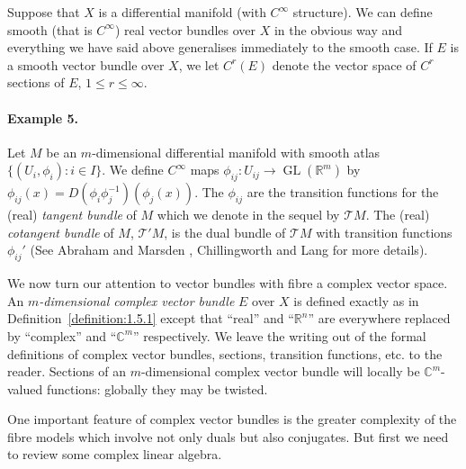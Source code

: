 Suppose that $X$ is a differential manifold (with $C^\infty$ structure). We can define smooth (that is $C^\infty$) real vector bundles over $X$ in the obvious way and everything we have said above generalises immediately to the smooth case. If $E$ is a smooth vector bundle over $X$, we let $C^r(E)$ denote the vector space of $C^r$ sections of $E$, $1\leq r\leq\infty$.

\paragraph*{Example 5.} Let $M$ be an $m$-dimensional differential manifold with smooth atlas $\{(U_i,\phi_i):i\in I\}$. We define $C^\infty$ maps $\phi_{ij}:U_{ij}\to\operatorname{GL}(\mathbb R^m)$ by $\phi_{ij}(x)=D(\phi_i\phi_j^{-1})(\phi_j(x))$. The $\phi_{ij}$ are the transition functions for the (real) \emph{tangent bundle} of $M$ which we denote in the sequel by $\mathcal T M$. The (real) \emph{cotangent bundle} of $M$, $\mathcal T'M$, is the dual bundle of $\mathcal T M$ with transition functions $\phi_{ij}'$ (See Abraham and Marsden \cite{bib:I:abraham-r-and-marsden-j-e:1}, Chillingworth \cite{bib:I:chillingworth-d-r-j:1} and Lang \cite{bib:I:lang-s:1} for more details).

We now turn our attention to vector bundles with fibre a complex vector space. An \emph{$m$-dimensional complex vector bundle} $E$ over $X$ is defined exactly as in Definition~\ref{definition:1.5.1} except that ``real'' and ``$\mathbb R^n$'' are everywhere replaced by ``complex'' and ``$\mathbb C^m$'' respectively. We leave the writing out of the formal definitions of complex vector bundles, sections, transition functions, etc. to the reader. Sections of an $m$-dimensional complex vector bundle will locally be $\mathbb C^m$-valued functions: globally they may be twisted.

One important feature of complex vector bundles is the greater complexity of the fibre models which involve not only duals but also conjugates. But first we need to review some complex linear algebra.

